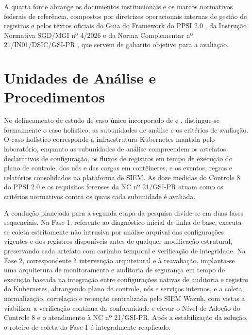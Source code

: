 A quarta fonte abrange os documentos institucionais e os marcos normativos federais de referência, compostos por diretrizes operacionais internas de gestão de registros e pelos textos oficiais do Guia do Framework do PPSI 2.0 \cite{ppsi2026}, da Instrução Normativa SGD/MGI nº 4/2026 \cite{in4_2026} e da Norma Complementar nº 21/IN01/DSIC/GSI-PR \cite{nc21_2014}, que servem de gabarito objetivo para a avaliação.



\section{Unidades de Análise e Procedimentos}
\label{sec:ec_unidades_procedimentos}


No delineamento de estudo de caso único incorporado de  e , distingue-se formalmente o caso holístico, as subunidades de análise e os critérios de avaliação. O caso holístico corresponde à infraestrutura Kubernetes mantida pelo laboratório, enquanto as subunidades de análise compreendem os artefatos declarativos de configuração, os fluxos de registros em tempo de execução do plano de controle, dos nós e das cargas em contêineres, e os eventos, regras e relatórios consolidados na plataforma de SIEM. As doze medidas do Controle 8 do PPSI 2.0 \cite{ppsi2026} e os requisitos forenses da NC nº 21/GSI-PR \cite{nc21_2014} atuam como os critérios normativos contra os quais cada subunidade é avaliada.

A condução planejada para a segunda etapa da pesquisa divide-se em duas fases sequenciais. Na Fase 1, referente ao diagnóstico inicial de linha de base, executa-se coleta estritamente não intrusiva por análise arquival \cite{lethbridge2005,runeson2012} das configurações vigentes e dos registros disponíveis antes de qualquer modificação estrutural, preservando cada artefato com carimbo temporal e verificação de integridade. Na Fase 2, correspondente à intervenção arquitetural e à reavaliação, implanta-se uma arquitetura de monitoramento e auditoria de segurança em tempo de execução baseada na integração entre configurações nativas de auditoria e registro do Kubernetes, abrangendo plano de controle, nós e serviços internos, e a coleta, normalização, correlação e retenção centralizada pelo SIEM Wazuh, com vistas a viabilizar a verificação contínua da conformidade e elevar o Nível de Adoção do Controle 8 e o atendimento à NC nº 21/GSI-PR. Após a estabilização da solução, o roteiro de coleta da Fase 1 é integralmente reaplicado.

